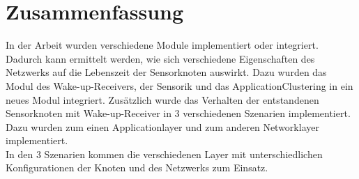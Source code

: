 \chapter{Zusammenfassung}

In der Arbeit wurden verschiedene Module implementiert oder integriert. Dadurch kann ermittelt werden, wie sich verschiedene Eigenschaften des Netzwerks auf die Lebenszeit der Sensorknoten auswirkt. Dazu wurden das Modul des Wake-up-Receivers, der Sensorik und das ApplicationClustering in ein neues Modul integriert. Zusätzlich wurde das Verhalten der entstandenen Sensorknoten mit Wake-up-Receiver in 3 verschiedenen Szenarien implementiert. Dazu wurden zum einen Applicationlayer und zum anderen Networklayer implementiert.\\
In den 3 Szenarien kommen die verschiedenen Layer mit unterschiedlichen Konfigurationen der Knoten und des Netzwerks zum Einsatz. 